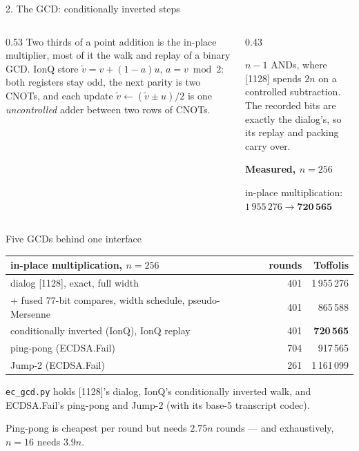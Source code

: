 \documentclass[aspectratio=169,11pt]{beamer}
\newcommand{\peachtitle}[1]{{\bfseries\color{cverm}#1}\par\vskip1mm}
\newcommand{\code}[2][]{}
\begin{document}
\begin{frame}[fragile]{2. The GCD: conditionally inverted steps}
  \begin{columns}[T]
    \begin{column}{0.53\textwidth}
      Two thirds of a point addition is the in-place multiplier, most of it the walk and replay of a binary GCD.
      \vskip2mm
      IonQ store $\tilde v=v+(1-a)u$, $a=v\bmod2$: both registers stay odd, the next parity is two CNOTs, and each update $\tilde v\leftarrow(\tilde v\pm u)/2$ is one \emph{uncontrolled} adder between two rows of CNOTs.
    \end{column}
    \begin{column}{0.43\textwidth}
      \code[basicstyle=\ttfamily\footnotesize]{ci_add.py}
      \vskip1mm
      {\small $n-1$ ANDs, where [1128] spends $2n$ on a controlled subtraction. The recorded bits are exactly the dialog's, so its replay and packing carry over.}
      \begin{peachblock}\peachtitle{Measured, $n=256$}
        in-place multiplication: $1\,955\,276\to\mathbf{720\,565}$
      \end{peachblock}
    \end{column}
  \end{columns}
\end{frame}

\begin{frame}{Five GCDs behind one interface}
  \centering\small
  \renewcommand{\arraystretch}{1.15}
  \begin{tabular}{@{}lrr@{}}
    \toprule
    in-place multiplication, $n=256$ & rounds & Toffolis \\
    \midrule
    dialog [1128], exact, full width & 401 & 1\,955\,276 \\
    $+$ fused 77-bit compares, width schedule, pseudo-Mersenne & 401 & 865\,588 \\
    conditionally inverted (IonQ), IonQ replay & 401 & \textbf{720\,565} \\
    ping-pong (ECDSA.Fail) & 704 & 917\,565 \\
    Jump-2 (ECDSA.Fail) & 261 & 1\,161\,099 \\
    \bottomrule
  \end{tabular}
  \vskip3mm
  \raggedright \texttt{ec\_gcd.py} holds [1128]'s dialog, IonQ's conditionally inverted walk, and ECDSA.Fail's ping-pong and Jump-2 (with its base-5 transcript codec).
  \begin{takeaway}Ping-pong is cheapest per round but needs $2.75n$ rounds --- and exhaustively, $n=16$ needs $3.9n$.\end{takeaway}
\end{frame}
\end{document}
